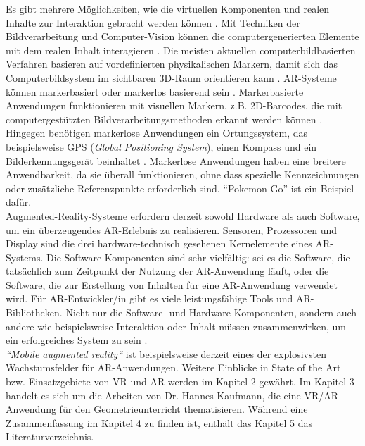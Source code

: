 \documentclass[deutsch]{llncs}
\begin{document}
Es gibt mehrere Möglichkeiten, wie die virtuellen Komponenten und realen Inhalte zur Interaktion gebracht werden können \cite{mullen_2011}. Mit Techniken der Bildverarbeitung und Computer-Vision können die computergenerierten Elemente mit dem realen Inhalt interagieren \cite{mullen_2011}. Die meisten aktuellen computerbildbasierten Verfahren basieren auf vordefinierten physikalischen Markern, damit sich das Computerbildsystem im sichtbaren 3D-Raum orientieren kann \cite{mullen_2011}. AR-Systeme können markerbasiert oder markerlos basierend sein \cite{Edu}. Markerbasierte Anwendungen funktionieren mit visuellen Markern, z.B. 2D-Barcodes, die mit computergestützten Bildverarbeitungsmethoden erkannt werden können \cite{Edu}. Hingegen benötigen markerlose Anwendungen ein Ortungssystem, das beispielsweise GPS (\emph{Global Positioning System}), einen Kompass und ein Bilderkennungsgerät beinhaltet \cite{Edu}. Markerlose Anwendungen haben eine breitere Anwendbarkeit, da sie überall funktionieren, ohne dass spezielle Kennzeichnungen oder zusätzliche Referenzpunkte erforderlich sind\cite{Edu}. ``Pokemon Go'' ist ein Beispiel dafür.\\
Augmented-Reality-Systeme erfordern derzeit sowohl Hardware als auch Software, um ein überzeugendes AR-Erlebnis zu realisieren\cite{craig_2013}. Sensoren, Prozessoren und Display sind die drei hardware-technisch gesehenen Kernelemente eines AR-Systems\cite{craig_2013}. Die Software-Komponenten sind sehr vielfältig: sei es die Software, die tatsächlich zum Zeitpunkt der Nutzung der AR-Anwendung läuft, oder die Software, die zur Erstellung von Inhalten für eine AR-Anwendung verwendet wird\cite{craig_2013}. Für AR-Entwickler/in gibt es viele leistungsfähige Tools und AR-Bibliotheken\cite{craig_2013}. Nicht nur die Software- und Hardware-Komponenten, sondern auch andere wie beispielsweise Interaktion oder Inhalt müssen zusammenwirken, um ein erfolgreiches System zu sein \cite{craig_2013}.\\

\emph{``Mobile augmented reality“} ist beispielsweise derzeit eines der explosivsten Wachstumsfelder für AR-Anwendungen\cite{craig_2013}. Weitere Einblicke in State of the Art bzw. Einsatzgebiete von VR und AR werden im Kapitel 2 gewährt. Im Kapitel 3 handelt es sich um die Arbeiten von Dr. Hannes Kaufmann, die eine VR/AR-Anwendung für den Geometrieunterricht thematisieren. Während eine Zusammenfassung im Kapitel 4 zu finden ist, enthält das Kapitel 5 das Literaturverzeichnis.
\end{document}
